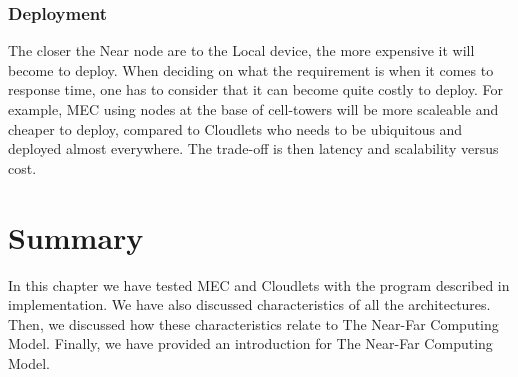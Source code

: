 \subsubsection{Deployment}
The closer the Near node are to the Local device, the more expensive it will become to deploy. When deciding on what the requirement is when it comes to response time, one has to consider that it can become quite costly to deploy. For example, MEC using nodes at the base of cell-towers will be more scaleable and cheaper to deploy, compared to Cloudlets who needs to be ubiquitous and deployed almost everywhere. The trade-off is then latency and scalability versus cost. 


\section{Summary}
In this chapter we have tested MEC and Cloudlets with the program described in implementation. We have also discussed characteristics of all the architectures. Then, we discussed how these characteristics relate to The Near-Far Computing Model. Finally, we have provided an introduction for The Near-Far Computing Model.





